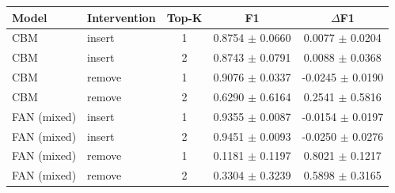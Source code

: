 \begin{tabular}{llccc}
\toprule
Model & Intervention & Top-K & F1 & $\Delta$F1 \\
\midrule
CBM & insert & 1 & 0.8754 $\pm$ 0.0660 & 0.0077 $\pm$ 0.0204 \\
CBM & insert & 2 & 0.8743 $\pm$ 0.0791 & 0.0088 $\pm$ 0.0368 \\
CBM & remove & 1 & 0.9076 $\pm$ 0.0337 & -0.0245 $\pm$ 0.0190 \\
CBM & remove & 2 & 0.6290 $\pm$ 0.6164 & 0.2541 $\pm$ 0.5816 \\
FAN (mixed) & insert & 1 & 0.9355 $\pm$ 0.0087 & -0.0154 $\pm$ 0.0197 \\
FAN (mixed) & insert & 2 & 0.9451 $\pm$ 0.0093 & -0.0250 $\pm$ 0.0276 \\
FAN (mixed) & remove & 1 & 0.1181 $\pm$ 0.1197 & 0.8021 $\pm$ 0.1217 \\
FAN (mixed) & remove & 2 & 0.3304 $\pm$ 0.3239 & 0.5898 $\pm$ 0.3165 \\
\bottomrule
\end{tabular}
